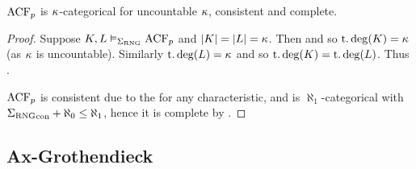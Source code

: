 \begin{prop}
    $\operatorname{ACF}_p$ is $\kappa$-categorical for uncountable $\kappa$, consistent 
    and complete.
\end{prop}
\begin{proof}
    Suppose $K,L \vDash_{\Sigma_{\mathrm{RNG}}} \operatorname{ACF}_p$ and $\left\vert K \right\vert = \left\vert L \right\vert = \kappa$.
    Then 
    and so $\operatorname{t.deg}(K) = \kappa$ (as $\kappa$ is uncountable).
    Similarly $\operatorname{t.deg}(L) = \kappa$ and so $\operatorname{t.deg}(K) = \operatorname{t.deg}(L)$.
    Thus .
    
    $\operatorname{ACF}_p$ is consistent due to the
    for any characteristic,
    and is $\aleph_1$-categorical with 
    ${\Sigma_{\mathrm{RNG}}}_\mathrm{con} + \aleph_0 \leq \aleph_1$,
    hence it is complete by .
\end{proof}

\subsection{Ax-Grothendieck}

